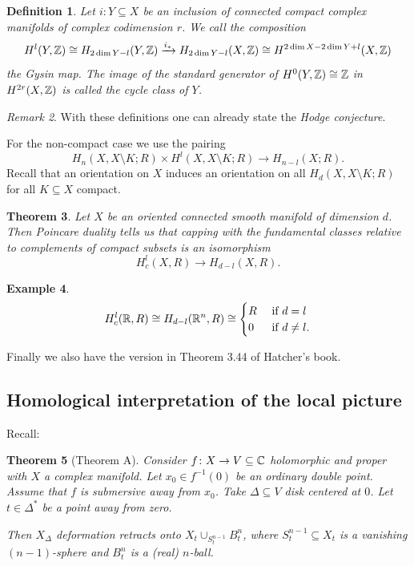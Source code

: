 \documentclass[A4paper, british]{amsart}
\theoremstyle{darkgreentheorem}
\newtheorem{thm}{Theorem}[section]
\theoremstyle{darkbluedefinition}
\newtheorem{defn}[thm]{Definition}
\theoremstyle{darkredexample}
\newtheorem{exa}[thm]{Example}
\theoremstyle{remark}
\newtheorem{rem}[thm]{Remark}
\newcommand{\1}{\mathbbm{1}}
\newcommand{\tms}{\times}
\newcommand{\sub}{\subseteq}
\begin{document}
\begin{defn}
    Let $i\colon Y\sub X$ be an inclusion of connected compact complex manifolds of complex codimension $r$.
    We call the composition
    \[ H^{l}(Y,\mathbb{Z})\cong H_{2\dim{Y}-l}(Y,\mathbb{Z})\xrightarrow{i_{*}} H_{2\dim{Y}-l}(X,\mathbb{Z})\cong H^{2\dim{X}-2\dim{Y}+l}(X,\mathbb{Z}) \]
    the \textit{Gysin map}.
    The image of the standard generator of $H^{0}(Y,\mathbb{Z})\cong \mathbb{Z}$ in $H^{2r}(X,\mathbb{Z})$ is called the \textit{cycle class} of $Y$.
\end{defn}

\begin{rem}
    With these definitions one can already state the \textit{Hodge conjecture}.
\end{rem}

For the non-compact case we use the pairing
\[ H_{n}(X,X\setminus K;R)\tms H^{l}(X,X\setminus K;R)\to H_{n-l}(X;R). \]
Recall that an orientation on $X$ induces an orientation on all $H_{d}(X,X\setminus K;R)$ for all $K\sub X$ compact.

\begin{thm}
    Let $X$ be an oriented connected smooth manifold of dimension $d$.
    Then Poincare duality tells us that capping with the fundamental classes relative to complements of compact subsets is an isomorphism
    \[ H^{l}_{c}(X,R)\to H_{d-l}(X,R). \]
\end{thm}

\begin{exa}
    \[ H^{l}_{c}(\mathbb{R},R)\cong H_{d-l}(\mathbb{R}^{n},R)\cong \begin{cases}
	R & \text{ if } d=l \\
	0 & \text{ if } d\neq l.
    \end{cases}
    \]
\end{exa}

Finally we also have the version in Theorem 3.44 of Hatcher's book.

\subsection{Homological interpretation of the local picture}

Recall:

\begin{thm}[Theorem A]
    Consider $f\colon X\to V\sub \C$ holomorphic and proper with $X$ a complex manifold.
    Let $x_{0}\in f^{-1}(0)$ be an ordinary double point.
    Assume that $f$ is submersive away from $x_{0}$.
    Take $\Delta\sub V$ disk centered at $0$.
    Let $t\in \Delta^{*}$ be a point away from zero.

    Then $X_{\Delta}$ deformation retracts onto $X_{t}\cup_{S_{t}^{n-1}}B^{n}_{t}$, where $S_{t}^{n-1}\sub X_{t}$ is a vanishing $(n-1)$-sphere and $B_{t}^{n}$ is a (real) $n$-ball.
\end{thm}
\end{document}
